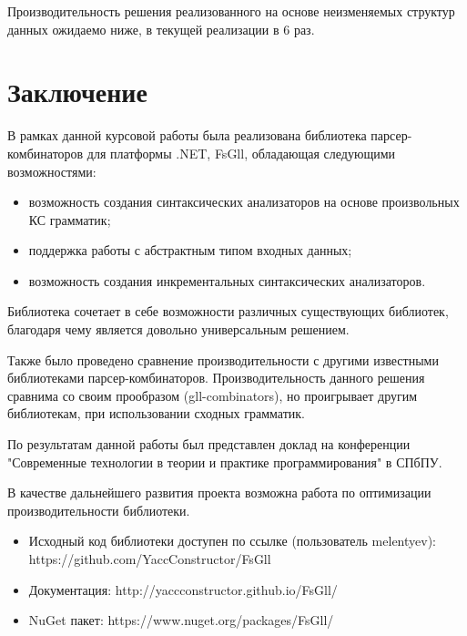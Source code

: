 \documentclass[14pt]{matmex-diploma}
\begin{document}
Производительность решения реализованного на основе неизменяемых структур данных ожидаемо ниже, 
в текущей реализации в 6 раз.


\section*{Заключение}
В рамках данной курсовой работы была реализована библиотека парсер-комбинаторов 
для платформы .NET, FsGll, обладающая следующими возможностями:
\begin{itemize}
    \item возможность создания синтаксических анализаторов на основе произвольных КС грамматик;
    \item поддержка работы с абстрактным типом входных данных;
    \item возможность создания инкрементальных синтаксических анализаторов.
\end{itemize}

Библиотека сочетает в себе возможности различных существующих библиотек, 
благодаря чему является довольно универсальным решением. 

Также было проведено сравнение производительности с другими известными библиотеками парсер-комбинаторов.
Производительность данного решения сравнима со своим прообразом (gll-combinators), 
но проигрывает другим библиотекам, при использовании сходных грамматик.


По результатам данной работы был представлен доклад на конференции 
"Современные технологии в теории и практике программирования" в СПбПУ.

В качестве дальнейшего развития проекта возможна работа по оптимизации производительности библиотеки.

\begin{itemize}
    \item Исходный код библиотеки доступен по ссылке (пользователь melentyev): https://github.com/YaccConstructor/FsGll
    \item Документация: http://yaccconstructor.github.io/FsGll/
    \item NuGet пакет: https://www.nuget.org/packages/FsGll/
\end{itemize}


\setmonofont[Mapping=tex-text]{CMU Typewriter Text}


\end{document}
